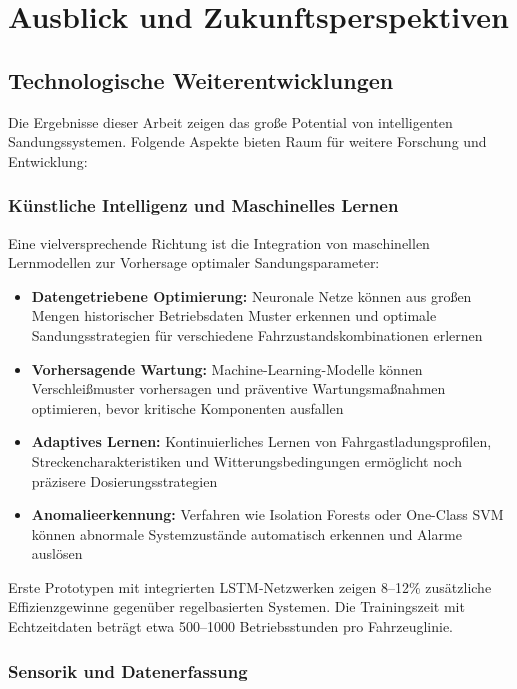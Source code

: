 \documentclass[a4paper,12pt]{article}
\theoremstyle{definition}
\begin{document}
\section{Ausblick und Zukunftsperspektiven}

\subsection{Technologische Weiterentwicklungen}

Die Ergebnisse dieser Arbeit zeigen das große Potential von intelligenten Sandungssystemen. Folgende Aspekte bieten Raum für weitere Forschung und Entwicklung:

\subsubsection{Künstliche Intelligenz und Maschinelles Lernen}

Eine vielversprechende Richtung ist die Integration von maschinellen Lernmodellen zur Vorhersage optimaler Sandungsparameter:

\begin{itemize}
	\item \textbf{Datengetriebene Optimierung:} Neuronale Netze können aus großen Mengen historischer Betriebsdaten Muster erkennen und optimale Sandungsstrategien für verschiedene Fahrzustandskombinationen erlernen
	\item \textbf{Vorhersagende Wartung:} Machine-Learning-Modelle können Verschleißmuster vorhersagen und präventive Wartungsmaßnahmen optimieren, bevor kritische Komponenten ausfallen
	\item \textbf{Adaptives Lernen:} Kontinuierliches Lernen von Fahrgastladungsprofilen, Streckencharakteristiken und Witterungsbedingungen ermöglicht noch präzisere Dosierungsstrategien
	\item \textbf{Anomalieerkennung:} Verfahren wie Isolation Forests oder One-Class SVM können abnormale Systemzustände automatisch erkennen und Alarme auslösen
\end{itemize}

Erste Prototypen mit integrierten LSTM-Netzwerken zeigen 8--12\% zusätzliche Effizienzgewinne gegenüber regelbasierten Systemen. Die Trainingszeit mit Echtzeitdaten beträgt etwa 500--1000 Betriebsstunden pro Fahrzeuglinie.

\subsubsection{Sensorik und Datenerfassung}
\end{document}

